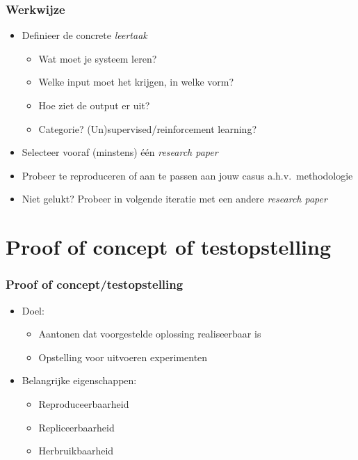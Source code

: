 \documentclass[aspectratio=169]{beamer}
\begin{document}
\begin{frame}[plain]
  \frametitle{Werkwijze}

  \begin{itemize}
    \item Definieer de concrete \textit{leertaak}
    \begin{itemize}
      \item Wat moet je systeem leren?
      \item Welke input moet het krijgen, in welke vorm?
      \item Hoe ziet de output er uit?
      \item Categorie? (Un)supervised/reinforcement learning?
    \end{itemize}
    \item Selecteer vooraf (minstens) één \textit{research paper}
    \item Probeer te reproduceren of aan te passen aan jouw casus a.h.v.\ methodologie
    \item Niet gelukt? Probeer in volgende iteratie met een andere \textit{research paper}
  \end{itemize}


\end{frame}

\section{Proof of concept of testopstelling}

\begin{frame}
  \frametitle{Proof of concept/testopstelling}

  \begin{itemize}
    \item Doel:
          \begin{itemize}
            \item Aantonen dat voorgestelde oplossing realiseerbaar is
            \item Opstelling voor uitvoeren experimenten
          \end{itemize}
    \item Belangrijke eigenschappen:
          \begin{itemize}
            \item Reproduceerbaarheid
            \item Repliceerbaarheid
            \item Herbruikbaarheid
          \end{itemize}
  \end{itemize}

\end{frame}
\end{document}
